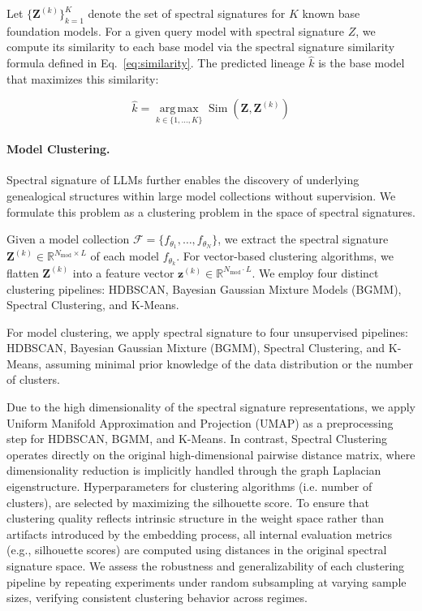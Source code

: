 Let $\{\mathbf{Z}^{(k)}\}_{k=1}^{K}$ denote the set of spectral signatures for $K$ known base foundation models. For a given query model with spectral signature $Z$, we compute its similarity to each base model via the spectral signature similarity formula defined in Eq.~\ref{eq:similarity}. The predicted lineage $\hat{k}$ is the base model that maximizes this similarity:

\begin{equation}
\hat{k} = \operatorname*{arg\,max}_{k \in \{1, \dots, K\}} \operatorname{Sim}(\mathbf{Z}, \mathbf{Z}^{(k)})
\end{equation}



\noindent\paragraph{Model Clustering. }
Spectral signature of LLMs further enables the discovery of underlying genealogical structures within large model collections without supervision. We formulate this problem as a clustering problem in the space of spectral signatures. 

Given a model collection $\mathcal{F} = \{f_{\theta_1}, \dots, f_{\theta_N}\}$, we extract the spectral signature $\mathbf{Z}^{(k)} \in \mathbb{R}^{N_{\text{mod}} \times L}$ of each model $f_{\theta_k}$. For vector-based clustering algorithms, we flatten $\mathbf{Z}^{(k)}$ into a feature vector $\mathbf{z}^{(k)} \in \mathbb{R}^{N_{\text{mod}} \cdot L}$. We employ four distinct clustering pipelines: HDBSCAN, Bayesian Gaussian Mixture Models (BGMM), Spectral Clustering, and K-Means.  

For model clustering, we apply spectral signature to four unsupervised pipelines: HDBSCAN, Bayesian Gaussian Mixture (BGMM), Spectral Clustering, and K-Means, assuming minimal prior knowledge of the data distribution or the number of clusters.  

Due to the high dimensionality of the spectral signature representations, we apply Uniform Manifold Approximation and Projection (UMAP) as a preprocessing step for HDBSCAN, BGMM, and K-Means. In contrast, Spectral Clustering operates directly on the original high-dimensional pairwise distance matrix, where dimensionality reduction is implicitly handled through the graph Laplacian eigenstructure. Hyperparameters for clustering algorithms (i.e. number of clusters), are selected by maximizing the silhouette score. To ensure that clustering quality reflects intrinsic structure in the weight space rather than artifacts introduced by the embedding process, all internal evaluation metrics (e.g., silhouette scores) are computed using distances in the original spectral signature space. We assess the robustness and generalizability of each clustering pipeline by repeating experiments under random subsampling at varying sample sizes, verifying consistent clustering behavior across regimes.

